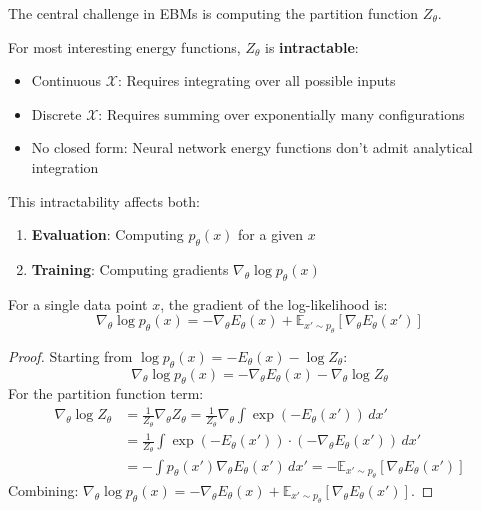 The central challenge in EBMs is computing the partition function $Z_\theta$.

\begin{remark}
    For most interesting energy functions, $Z_\theta$ is \textbf{intractable}:
    \begin{itemize}
        \item Continuous $\mathcal{X}$: Requires integrating over all possible inputs
        \item Discrete $\mathcal{X}$: Requires summing over exponentially many configurations
        \item No closed form: Neural network energy functions don't admit analytical integration
    \end{itemize}
    This intractability affects both:
    \begin{enumerate}
        \item \textbf{Evaluation}: Computing $p_\theta(x)$ for a given $x$
        \item \textbf{Training}: Computing gradients $\nabla_\theta \log p_\theta(x)$
    \end{enumerate}
\end{remark}

\begin{theorem}
    For a single data point $x$, the gradient of the log-likelihood is:
    \[
        \nabla_\theta \log p_\theta(x) = -\nabla_\theta E_\theta(x) + \mathbb{E}_{x' \sim p_\theta}[\nabla_\theta E_\theta(x')]
    \]
    \begin{proof}
        Starting from $\log p_\theta(x) = -E_\theta(x) - \log Z_\theta$:
        \[
            \nabla_\theta \log p_\theta(x) = -\nabla_\theta E_\theta(x) - \nabla_\theta \log Z_\theta
        \]
        For the partition function term:
        \begin{align*}
            \nabla_\theta \log Z_\theta &= \frac{1}{Z_\theta} \nabla_\theta Z_\theta = \frac{1}{Z_\theta} \nabla_\theta \int \exp(-E_\theta(x')) \, dx' \\
            &= \frac{1}{Z_\theta} \int \exp(-E_\theta(x')) \cdot (-\nabla_\theta E_\theta(x')) \, dx' \\
            &= -\int p_\theta(x') \nabla_\theta E_\theta(x') \, dx' = -\mathbb{E}_{x' \sim p_\theta}[\nabla_\theta E_\theta(x')]
        \end{align*}
        Combining: $\nabla_\theta \log p_\theta(x) = -\nabla_\theta E_\theta(x) + \mathbb{E}_{x' \sim p_\theta}[\nabla_\theta E_\theta(x')]$.
    \end{proof}
\end{theorem}

